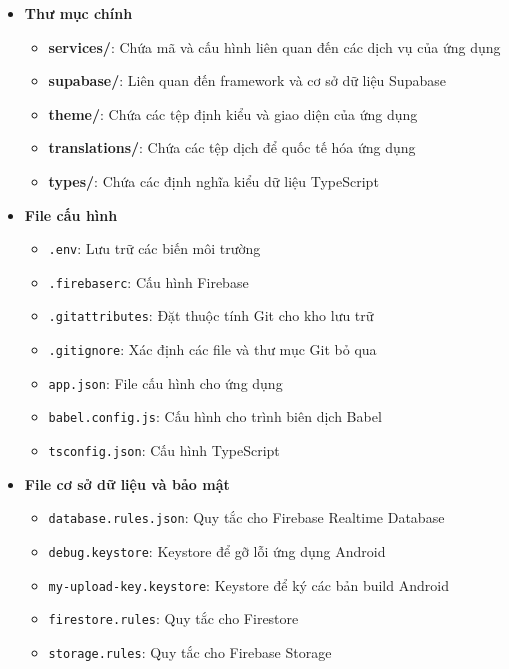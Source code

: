 \documentclass[a4paper]{report}
\begin{document}
\begin{itemize}
    \item \textbf{Thư mục chính}
    \begin{itemize}
        \item \textbf{services/}: Chứa mã và cấu hình liên quan đến các dịch vụ của ứng dụng
        \item \textbf{supabase/}: Liên quan đến framework và cơ sở dữ liệu Supabase
        \item \textbf{theme/}: Chứa các tệp định kiểu và giao diện của ứng dụng
        \item \textbf{translations/}: Chứa các tệp dịch để quốc tế hóa ứng dụng
        \item \textbf{types/}: Chứa các định nghĩa kiểu dữ liệu TypeScript
    \end{itemize}

    \item \textbf{File cấu hình}
    \begin{itemize}
        \item \texttt{.env}: Lưu trữ các biến môi trường
        \item \texttt{.firebaserc}: Cấu hình Firebase
        \item \texttt{.gitattributes}: Đặt thuộc tính Git cho kho lưu trữ
        \item \texttt{.gitignore}: Xác định các file và thư mục Git bỏ qua
        \item \texttt{app.json}: File cấu hình cho ứng dụng
        \item \texttt{babel.config.js}: Cấu hình cho trình biên dịch Babel
        \item \texttt{tsconfig.json}: Cấu hình TypeScript
    \end{itemize}

    \item \textbf{File cơ sở dữ liệu và bảo mật}
    \begin{itemize}
        \item \texttt{database.rules.json}: Quy tắc cho Firebase Realtime Database
        \item \texttt{debug.keystore}: Keystore để gỡ lỗi ứng dụng Android
        \item \texttt{my-upload-key.keystore}: Keystore để ký các bản build Android
        \item \texttt{firestore.rules}: Quy tắc cho Firestore
        \item \texttt{storage.rules}: Quy tắc cho Firebase Storage
    \end{itemize}


\end{itemize}
\end{document}
